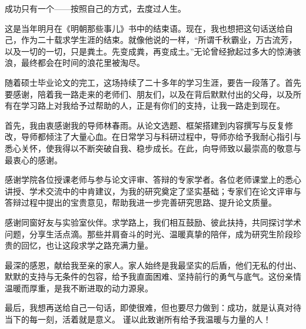  \setlength{\baselineskip}{20pt}
\begin{thanks}

成功只有一个——按照自己的方式，去度过人生。

这是当年明月在《明朝那些事儿》书中的结束语。现在，我也想把这句话送给自己，作为二十载求学生涯的结束。就像他说的一样，“所谓千秋霸业，万古流芳，以及一切的一切，只是粪土。先变成粪，再变成土。”无论曾经掀起过多大的惊涛骇浪，最终都会在时间的浪花里被淘尽。

随着硕士毕业论文的完工，这场持续了二十多年的学习生涯，要告一段落了。首先要感谢，陪着我一路走来的老师们、朋友们，以及在背后默默付出的父母，以及所有在学习路上对我给予过帮助的人，正是有你们的支持，让我一路走到现在。

首先，我由衷感谢我的导师林春雨。从论文选题、框架搭建到内容撰写与反复修改，导师都倾注了大量心血。在日常学习与科研过程中，导师亦给予我耐心指引与悉心关怀，使我得以不断突破自我、稳步成长。在此，向导师致以最崇高的敬意与最衷心的感谢。

感谢学院各位授课老师与参与论文评审、答辩的专家学者。各位老师课堂上的悉心讲授、学术交流中的中肯建议，为我的研究奠定了坚实基础；专家们在论文评审与答辩过程中提出的宝贵意见，帮助我进一步完善研究思路、提升论文质量。

感谢同窗好友与实验室伙伴。求学路上，我们相互鼓励、彼此扶持，共同探讨学术问题，分享生活点滴。那些并肩奋斗的时光、温暖真挚的陪伴，成为研究生阶段珍贵的回忆，也让这段求学之路充满力量。

最深的感恩，献给我至亲的家人。家人始终是我最坚实的后盾，他们无私的付出、默默的支持与无条件的包容，给予我直面困难、坚持前行的勇气与底气。这份亲情温暖而厚重，是我不断进取的动力源泉。

最后，我想再送给自己一句话，即使很难，但也要尽力做到：成功，就是认真对待当下的每一刻，活着就是意义。
谨以此致谢所有给予我温暖与力量的人！









\end{thanks}
